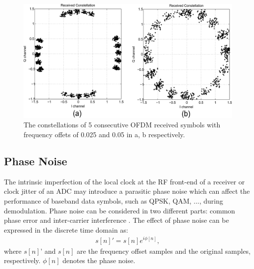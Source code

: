 \begin{figure}
	\centerline{\includegraphics [width=0.8\columnwidth] {Figures/freoff_5sym.pdf} }
	\caption{The constellations of 5 consecutive OFDM received symbols with frequency offets of 0.025 and 0.05 in a, b respectively.}
	\label{fig:freoff_5sym}
\end{figure}

\subsection{Phase Noise}

The intrinsic imperfection of the local clock at the RF front-end of a receiver or clock jitter of an ADC may introduce a parasitic phase noise which can affect the performance of baseband data symbols, such as QPSK, QAM, ..., during demodulation.
Phase noise can be considered in two different parts: common phase error and inter-carrier interference \cite{Armada1998}. The effect of phase noise can be expressed in the discrete time domain as:
\begin{eqnarray}
\label{equ:}
            s[n]' = s[n] e^{i\phi[n]},
\end{eqnarray}	
where $s[n]’$ and $s[n]$ are the frequency offset samples and the original samples, respectively.
$\phi[n]$ denotes the phase noise.

